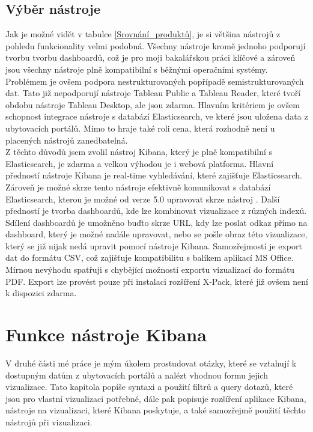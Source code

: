\documentclass[czech,BP]{thesiskiv}
\begin{document}
\section{Výběr nástroje}
Jak je možné vidět v tabulce \ref{Srovnání_produktů}, je si většina nástrojů z pohledu funkcionality velmi podobná. Všechny nástroje kromě jednoho podporují tvorbu tvorbu dashboardů, což je pro moji bakalářskou práci klíčové a zároveň jsou všechny nástroje plně kompatibilní s běžnými operačními systémy. Problémem je ovšem podpora nestrukturovaných popřípadě semistrukturovaných dat. Tato již nepodporují nástroje Tableau Public a Tableau Reader, které tvoří obdobu nástroje Tableau Desktop, ale jsou zdarma. Hlavním kritériem je ovšem schopnost integrace nástroje s databází Elasticsearch, ve které jsou uložena data z ubytovacích portálů. Mimo to hraje také roli cena, která rozhodně není u placených nástrojů zanedbatelná. 
\\
Z těchto důvodů jsem zvolil nástroj Kibana, který je plně kompatibilní s Elasticsearch, je zdarma a velkou výhodou je i webová platforma. Hlavní předností nástroje Kibana je real-time vyhledávání, které zajišťuje Elasticsearch. Zároveň je možné skrze tento nástroje efektivně komunikovat s databází Elasticsearch, kterou je možné od verze 5.0 upravovat skrze nástroj . Další předností je tvorba dashboardů, kde lze kombinovat vizualizace z různých indexů. Sdílení dashboardů je umožněno buďto skrze URL, kdy lze poslat odkaz přímo na dashboard, který je možné nadále upravovat, nebo se pošle obraz této vizualizace, který se již nijak nedá upravit pomocí nástroje Kibana. Samozřejmostí je export dat do formátu CSV, což zajišťuje kompatibilitu s balíkem aplikací MS Office. Mírnou nevýhodu spatřuji s chybějící možností exportu vizualizací do formátu PDF. Export lze provést pouze při instalaci rozšíření X-Pack, které již ovšem není k dispozici zdarma.
\chapter{Funkce nástroje Kibana}
\label{Funkce_nástroje}
V druhé části mé práce je mým úkolem prostudovat otázky, které se vztahují k dostupným datům z ubytovacích portálů a nalézt vhodnou formu jejich vizualizace. Tato kapitola popíše syntaxi a použití filtrů a query dotazů, které jsou pro vlastní vizualizaci potřebné, dále pak popisuje rozšíření aplikace Kibana, nástroje na vizualizaci, které Kibana poskytuje, a také samozřejmě použití těchto nástrojů při vizualizaci.
\end{document}
